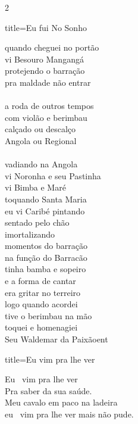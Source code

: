 \documentclass[fontsize=14pt, paper=a4, twoside, DIV=20]{scrreprt} %
\begin{document}
\begin{multicols*}{2}
\begin{song}{title={Eu fui No Sonho}}
\begin{verse*}
            quando cheguei no portão\\
            vi Besouro Mangangá\\
            protejendo o barração\\
            pra maldade não entrar\\
\\
            a roda de outros tempos\\
            com violão e berimbau\\
            calçado ou descalço\\
            Angola ou Regional\\
\\
            vadiando na Angola\\
            vi Noronha e seu Pastinha\\
            vi Bimba e Maré\\
            toquando Santa Maria\\

            eu vi Caribé pintando\\
            sentado pelo chão\\
            imortalizando\\
            momentos do barração\\

            na função do Barracão\\
            tinha bamba e sopeiro\\
            e a forma de cantar\\
            era gritar no terreiro\\


            logo quando acordei\\
            tive o berimbau na mão\\
            toquei e homenagiei\\
            Seu Waldemar da Paixãoent\\
    \end{verse*}
\end{song}

\begin{song}{title={Eu vim pra lhe ver}}
       \begin{verse*}
           Eu \ vim pra lhe ver\\
            Pra saber da sua saúde.\\
            Meu cavalo em paco na ladeira\\
            eu \ vim pra lhe ver mais não pude.\\
       \end{verse*}
\end{song}


\end{multicols*}
\end{document}
